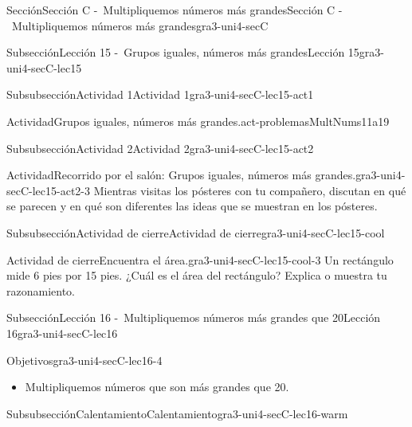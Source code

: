 \documentclass[twoside,10pt,]{article}
\begin{document}
\begin{sectionptx}{Sección}{Sección C -~Multipliquemos números más grandes}{}{Sección C -~Multipliquemos números más grandes}{}{}{gra3-uni4-secC}
\begin{subsectionptx}{Subsección}{Lección 15 -~Grupos iguales, números más grandes}{}{Lección 15}{}{}{gra3-uni4-secC-lec15}
\begin{subsubsectionptx}{Subsubsección}{Actividad 1}{}{Actividad 1}{}{}{gra3-uni4-secC-lec15-act1}
\begin{activity}{Actividad}{Grupos iguales, números más grandes.}{act-problemasMultNums11a19}
\begin{enumerate}
\end{enumerate}
\end{activity}%
\end{subsubsectionptx}
%
%
\typeout{************************************************}
\typeout{************************************************}
%
\begin{subsubsectionptx}{Subsubsección}{Actividad 2}{}{Actividad 2}{}{}{gra3-uni4-secC-lec15-act2}
\begin{activity}{Actividad}{Recorrido por el salón: Grupos iguales, números más grandes.}{gra3-uni4-secC-lec15-act2-3}%
Mientras visitas los pósteres con tu compañero, discutan en qué se parecen y en qué son diferentes las ideas que se muestran en los pósteres.%
\end{activity}%
\end{subsubsectionptx}
%
%
\typeout{************************************************}
\typeout{************************************************}
%
\begin{subsubsectionptx}{Subsubsección}{Actividad de cierre}{}{Actividad de cierre}{}{}{gra3-uni4-secC-lec15-cool}
\begin{project}{Actividad de cierre}{Encuentra el área.}{gra3-uni4-secC-lec15-cool-3}%
Un rectángulo mide 6 pies por 15 pies. ¿Cuál es el área del rectángulo? Explica o muestra tu razonamiento.%
\end{project}%
\end{subsubsectionptx}
\end{subsectionptx}
%
%
\typeout{************************************************}
\typeout{************************************************}
%
\begin{subsectionptx}{Subsección}{Lección 16 -~Multipliquemos números más grandes que 20}{}{Lección 16}{}{}{gra3-uni4-secC-lec16}
\begin{objectives}{Objetivos}{gra3-uni4-secC-lec16-4}
%
\begin{itemize}[label=\textbullet]
\item{}Multipliquemos números que son más grandes que 20.%
\end{itemize}
\end{objectives}
%
%
\typeout{************************************************}
\typeout{************************************************}
%
\begin{subsubsectionptx}{Subsubsección}{Calentamiento}{}{Calentamiento}{}{}{gra3-uni4-secC-lec16-warm}

\end{subsubsectionptx}
\end{subsectionptx}
\end{sectionptx}
\end{document}
